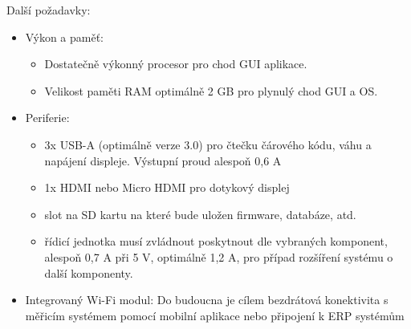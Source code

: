Další požadavky:
\begin{itemize}
    \item Výkon a paměť: 
        \begin{itemize}
            \item Dostatečně výkonný procesor pro chod GUI aplikace.
            \item Velikost paměti RAM optimálně 2 GB pro plynulý chod GUI a OS.
        \end{itemize}
    \item Periferie:
        \begin{itemize}
            \item 3x USB-A (optimálně verze 3.0) pro čtečku čárového kódu, váhu a napájení displeje. Výstupní proud alespoň 0,6 A 
            \item 1x HDMI nebo Micro HDMI pro dotykový displej
            \item slot na SD kartu na které bude uložen firmware, databáze, atd.
            
            
            \item řídicí jednotka musí zvládnout poskytnout dle vybraných komponent, alespoň 0,7 A při 5 V, optimálně 1,2 A, pro případ rozšíření systému o další komponenty.
        \end{itemize}
    \item Integrovaný Wi-Fi modul: Do budoucna je cílem bezdrátová konektivita s měřicím systémem pomocí mobilní aplikace nebo připojení k ERP systémům
\end{itemize}

